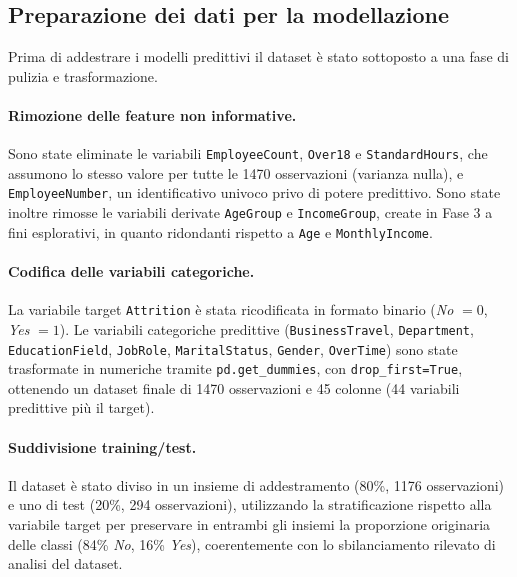 \documentclass{article}
\begin{document}
\subsection{Preparazione dei dati per la modellazione}
\label{sec:metodologia-prep}

Prima di addestrare i modelli predittivi il dataset è stato sottoposto a una fase di pulizia e trasformazione.

\paragraph{Rimozione delle feature non informative.} Sono state eliminate le variabili \texttt{EmployeeCount}, \texttt{Over18} e \texttt{StandardHours}, che assumono lo stesso valore per tutte le 1470 osservazioni (varianza nulla), e \texttt{EmployeeNumber}, un identificativo univoco privo di potere predittivo. Sono state inoltre rimosse le variabili derivate \texttt{AgeGroup} e \texttt{IncomeGroup}, create in Fase 3 a fini esplorativi, in quanto ridondanti rispetto a \texttt{Age} e \texttt{MonthlyIncome}.

\paragraph{Codifica delle variabili categoriche.} La variabile target \texttt{Attrition} è stata ricodificata in formato binario (\emph{No} $ = 0$, \emph{Yes} $ = 1$). Le variabili categoriche predittive (\texttt{BusinessTravel}, \texttt{Department}, \texttt{EducationField}, \texttt{JobRole}, \texttt{MaritalStatus}, \texttt{Gender}, \texttt{OverTime}) sono state trasformate in numeriche tramite \texttt{pd.get\_dummies}, con \texttt{drop\_first=True}, ottenendo un dataset finale di 1470 osservazioni e 45 colonne (44 variabili predittive più il target).

\paragraph{Suddivisione training/test.} Il dataset è stato diviso in un insieme di addestramento (80\%, 1176 osservazioni) e uno di test (20\%, 294 osservazioni), utilizzando la stratificazione rispetto alla variabile target per preservare in entrambi gli insiemi la proporzione originaria delle classi (84\% \emph{No}, 16\% \emph{Yes}), coerentemente con lo sbilanciamento rilevato di analisi del dataset.
\end{document}
